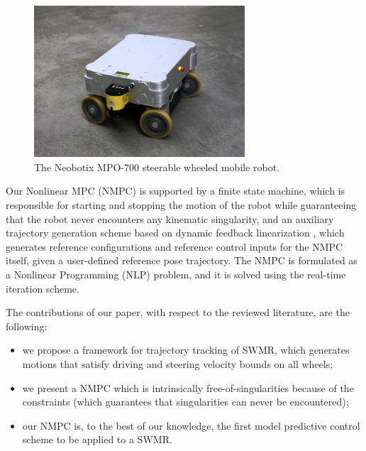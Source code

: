 \begin{figure}
    \centering
    \includegraphics[width=0.7\textwidth]{figures/SWMR/mpo-700.jpg}
    \caption{The Neobotix MPO-700 steerable wheeled mobile robot.}
    \label{fig:mpo-700}
\end{figure}

Our Nonlinear MPC (NMPC) is supported by a finite state machine, which is
responsible for starting and stopping the motion of the robot while
guaranteeing that the robot never encounters any kinematic singularity, and
an auxiliary trajectory generation scheme based on dynamic feedback
linearization \cite{Oriolo2002WMRControlDFL}, which generates reference
configurations and reference control inputs for the NMPC itself, given a
user-defined reference pose trajectory. The NMPC is formulated as a Nonlinear
Programming (NLP) problem, and it is solved using the real-time iteration
\cite{Gros2020Fromlineartononlinear} scheme.

The contributions of our paper, with respect to the reviewed literature, are
the following:
\begin{itemize}
    \item we propose a framework for trajectory tracking of SWMR, which
        generates motions that satisfy driving and steering velocity bounds
        on all wheels;
    \item we present a NMPC which is intrinsically free-of-singularities
        because of the constraints (which guarantees that singularities can
        never be encountered);
    \item our NMPC is, to the best of our knowledge, the first model predictive
        control scheme to be applied to a SWMR.
\end{itemize}

